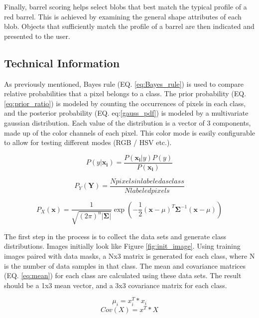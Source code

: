 \documentclass[a4paper]{article}
\begin{document}
	Finally, barrel scoring helps select blobs that best match the typical profile of a red barrel. This is achieved by examining the general shape attributes of each blob. Objects that sufficiently match the profile of a barrel are then indicated and presented to the user.


\subsection{Technical Information}

As previously mentioned, Bayes rule (EQ. \ref{eq:Bayes_rule}) is used to compare relative probabilities that a pixel belongs to a class. The prior probability (EQ. \ref{eq:prior_ratio}) is modeled by counting the occurrences of pixels in each class, and the posterior probability (EQ. eq:\ref{gauss_pdf}) is modeled by a multivariate gaussian distribution. Each value of the distribution is a vector of 3 components, made up of the color channels of each pixel. This color mode is easily configurable to allow for testing different modes (RGB / HSV etc.).

\begin{equation*}\label{eq:Bayes_rule}
P(y | \boldsymbol{x_i}) = \dfrac{P(\boldsymbol{x_i}|y)P(y)}{P(\boldsymbol{x_i})}
\end{equation*}

\begin{equation*}\label{eq:prior_ratio}
P_Y(\boldsymbol{Y}) = 
\dfrac{N pixels in labeled as class}{N labeled pixels}
\end{equation*}

\begin{equation*}\label{eq:gauss_pdf}
P_X(\boldsymbol{x})=\frac{1}{\sqrt{(2\pi)^n|\boldsymbol\Sigma|}}
\exp\left(-\frac{1}{2}(\boldsymbol{x}-{\mu})^T{\boldsymbol\Sigma}^{-1}(\boldsymbol{x}-{\mu})
\right)
\end{equation*}

	The first step in the process is to collect the data sets and generate class distributions. Images initially look like Figure \ref{fig:init_image}. Using training images paired with data masks, a Nx3 matrix is generated for each class, where N is the number of data samples in that class. The mean and covariance matrices (EQ. \ref{eq:mean}) for each class are calculated using these data sets. The result should be a 1x3 mean vector, and a 3x3 covariance matrix for each class.
    
\begin{equation*}\label{eq:mean}
\mu_i = x_i^T * x_i 
\end{equation*}
\begin{equation*}
Cov(X) = x^T * X
\end{equation*}
 
\end{document}
